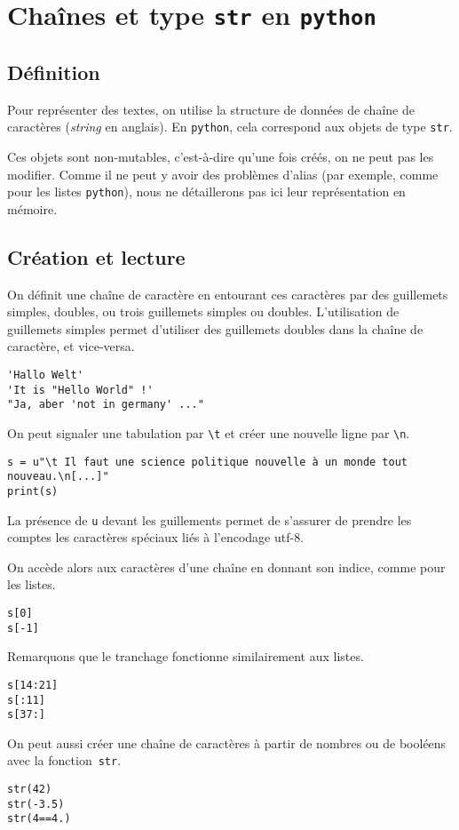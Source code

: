 \section{Chaînes et type \texttt{str} en \texttt{python}}

\subsection{Définition}

Pour représenter des textes, on utilise la structure de données de \og chaîne de caractères \fg{} (\emph{string} en anglais). En \texttt{python}, cela correspond aux objets de type \texttt{str}.

Ces objets sont non-mutables, c'est-à-dire qu'une fois créés, on ne peut pas les modifier. 
Comme il ne peut y avoir des problèmes d'alias (par exemple, comme pour les listes \texttt{python}), nous ne détaillerons pas ici leur représentation en mémoire. 

\subsection{Création et lecture}

On définit une chaîne de caractère en entourant ces caractères par des guillemets simples, doubles, ou trois guillemets simples ou doubles. 
L'utilisation de guillemets simples permet d'utiliser des guillemets doubles dans la chaîne de caractère, et vice-versa.
\begin{lstlisting}
'Hallo Welt'
'It is "Hello World" !'
"Ja, aber 'not in germany' ..."
\end{lstlisting}

On peut signaler une tabulation par \texttt{\textbackslash t} et créer une nouvelle ligne par \texttt{\textbackslash n}.

\begin{lstlisting}
s = u"\t Il faut une science politique nouvelle à un monde tout nouveau.\n[...]"
print(s)
\end{lstlisting}


\begin{rem}
La présence de \texttt{u} devant les guillements permet de s'assurer de prendre les comptes les caractères spéciaux liés à l'encodage utf-8.
\end{rem}

On accède alors aux caractères d'une chaîne en donnant son indice, comme pour les listes. 
\begin{lstlisting}
s[0]
s[-1]
\end{lstlisting}
Remarquons que le tranchage fonctionne similairement aux listes.
\begin{lstlisting}
s[14:21]
s[:11]
s[37:]
\end{lstlisting}
On peut aussi créer une chaîne de caractères à partir de nombres ou de booléens avec la fonction~\texttt{str}.
\begin{lstlisting}
str(42)
str(-3.5)
str(4==4.)
\end{lstlisting}

